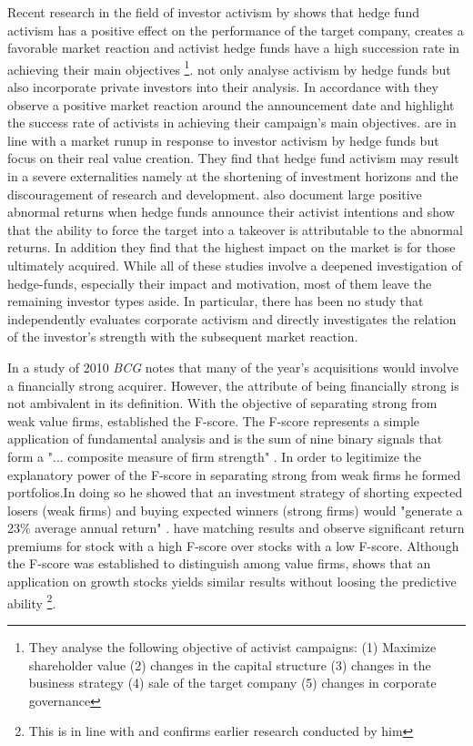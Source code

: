 \documentclass[12pt]{article}
\begin{document}
Recent research in the field of investor activism by \citet{Brav2008} shows that hedge fund activism has a positive effect on the performance of the target company, creates a favorable market reaction and activist hedge funds have a high succession rate in achieving their main objectives \footnote{They analyse the following objective of activist campaigns: (1) Maximize shareholder value (2) changes in the capital structure (3) changes in the business strategy (4) sale of the target company (5) changes in corporate governance}.
\citet{Klein2009} not only analyse activism by hedge funds but also incorporate private investors into their analysis. In accordance with \citet{Brav2008} they observe a positive market reaction around the announcement date and highlight the success rate of activists in achieving their campaign's main objectives.
\citet{CoffeeJr.2014} are in line with a market runup in response to investor activism by hedge funds but focus on their real value creation. They find that hedge fund activism may result in a severe externalities namely at the shortening of investment horizons and the discouragement of research and development. \citet{Greenwood2009} also document large positive abnormal returns when hedge funds announce their activist intentions and show that the ability to force the target into a takeover is attributable to the abnormal returns. In addition they find that the highest impact on the market is for those ultimately acquired.
While all of these studies involve a deepened investigation of hedge-funds, especially their impact and motivation, most of them leave the remaining investor types aside. In particular, there has been no study that independently evaluates corporate activism and directly investigates the relation of the investor's strength with the subsequent market reaction. 

 In a study of 2010 \emph{BCG} notes that many of the year's acquisitions would involve a financially strong acquirer. However, the attribute of being financially strong is not ambivalent in its definition. With the objective of separating strong from weak value firms, \citet{Piotroski2000} established the F-score. The F-score represents a simple application of fundamental analysis and is the sum of nine binary signals that form a "... composite measure of firm strength" \citep[p. 496]{Fama2006}. In order to legitimize the explanatory power of the F-score in separating strong from weak firms he formed portfolios.In doing so he showed that an investment strategy of shorting expected losers (weak firms) and buying expected winners (strong firms) would "generate a 23\% average annual return" \citep[p. 4]{Piotroski2000}. \citet{Hyde2014} have matching results and observe significant return premiums for stock with a high F-score over stocks with a low F-score. Although the F-score was established to distinguish among value firms, \citet{Mohr2012} shows that an application on growth stocks yields similar results without loosing the predictive ability \footnote{This is in line with \citet{Piotroski2000} and confirms earlier research conducted by him}.
\end{document}
